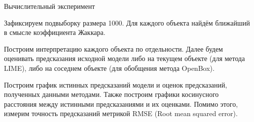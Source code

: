 \documentclass{beamer}
\begin{document}
\begin{frame}{Вычислительный эксперимент}

Зафиксируем подвыборку размера 1000. Для каждого объекта найдём ближайший в смысле коэффициента Жаккара.
\bigskip

Построим интерпретацию каждого объекта по отдельности. Далее будем оценивать предсказания исходной модели либо на текущем объекте (для метода LIME), либо на соседнем объекте (для обобщения метода OpenBox).
\bigskip

Построим график истинных предсказаний модели и оценок предсказаний, полученных данными методами. Также построим графики косинусного расстояния между истинными предсказаниями и их оценками. Помимо этого, измерим точность предсказаний метрикой RMSE (Root mean squared error).
\end{frame}
\end{document}
